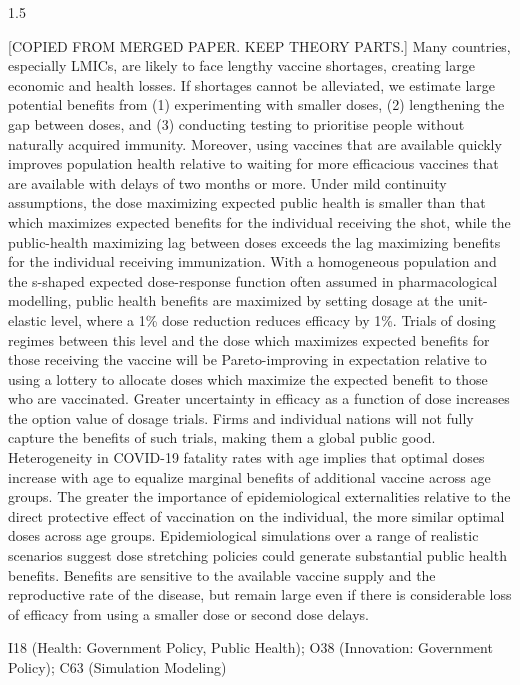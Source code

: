 \documentclass[12pt]{article}
\begin{document}
\begin{spacing}{1.5}
\begin{titlepage}
{\footnotesize {} [COPIED FROM MERGED PAPER. KEEP THEORY PARTS.] Many countries, especially LMICs, are likely to face lengthy vaccine shortages, creating large economic and health losses.  If shortages cannot be alleviated, we estimate large potential benefits from (1) experimenting with smaller doses, (2) lengthening the gap between doses, and (3) conducting testing to prioritise people without naturally acquired immunity. Moreover, using vaccines that are available quickly improves population health relative to waiting for more efficacious vaccines that are available with delays of two months or more. Under mild continuity assumptions, the dose maximizing expected public health is smaller than that which maximizes expected benefits for the individual receiving the shot, while the public-health maximizing lag between doses exceeds the lag maximizing benefits for the individual receiving immunization. With a homogeneous population and the s-shaped expected dose-response function often assumed in pharmacological modelling, public health benefits are maximized by setting dosage at the unit-elastic level, where a 1\% dose reduction reduces efficacy by 1\%. Trials of dosing regimes between this level and the dose which maximizes expected benefits for those receiving the vaccine will be Pareto-improving in expectation relative to using a lottery to allocate doses which maximize the expected benefit to those who are vaccinated.  Greater uncertainty in efficacy as a function of dose increases the option value of dosage trials. Firms and individual nations will not fully capture the benefits of such trials, making them a global public good. Heterogeneity in COVID-19 fatality rates with age implies that optimal doses increase with age to equalize marginal benefits of additional vaccine across age groups. The greater the importance of epidemiological externalities relative to the direct protective effect of vaccination on the individual, the more similar optimal doses across age groups.  Epidemiological simulations over a range of realistic scenarios suggest dose stretching policies could generate substantial public health benefits. Benefits are sensitive to the available vaccine supply and the reproductive rate of the disease, but remain large even if there is considerable loss of efficacy from using a smaller dose or second dose delays.}

\vfill

 I18 (Health: Government Policy, Public Health); O38 (Innovation: Government Policy); C63 (Simulation Modeling) 


\end{titlepage}
\end{spacing}
\end{document}
